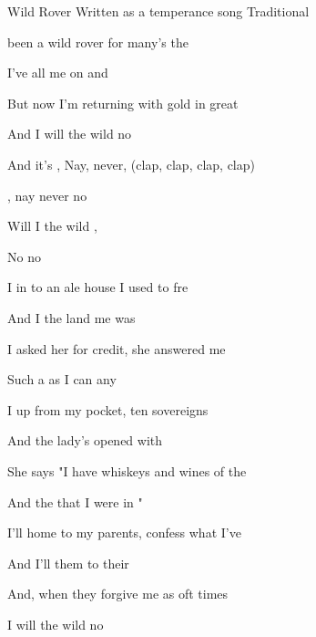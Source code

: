\begin{SBSong}{Wild Rover}
  {Written as a temperance song}
  {Traditional}
  \begin{SBVerse}
     been a wild rover for many's the 

    I've  all me  on  and 

    But now I'm returning with gold in great 

    And I  will  the wild  no 
  \end{SBVerse}
  \begin{SBChorus}
    And it's , Nay, never, (clap, clap, clap, clap)

    , nay never no 

    Will I  the wild ,

    No  no 
  \end{SBChorus}
  \begin{SBVerse}
    I  in to an ale house I used to fre

    And I  the land me  was 

    I asked her for credit, she answered me 

    Such a  as  I can  any 
  \end{SBVerse}
  \begin{SBVerse}
    I  up from my pocket, ten sovereigns 

    And the lady's  opened  with 

    She says "I have whiskeys and wines of the 

    And the  that I  were  in "
  \end{SBVerse}
  \begin{SBVerse}
    I'll  home to my parents, confess what I've 

    And I'll  them to  their  

    And, when they forgive me as oft times 

    I  will  the wild  no 
  \end{SBVerse}
\end{SBSong}
